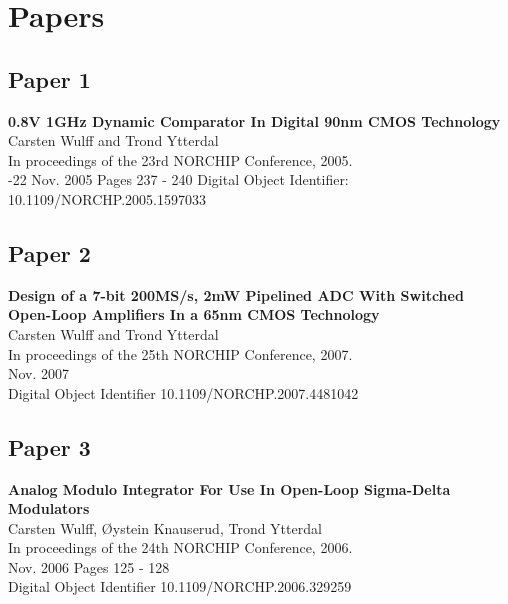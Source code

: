 

\chapter{Papers}\label{sc:papers}
\section{Paper 1}
\textbf{\Large 0.8V 1GHz Dynamic Comparator In Digital 90nm CMOS
  Technology}\\
\indent   Carsten Wulff and Trond Ytterdal\\
\indent In proceedings of the 23rd NORCHIP Conference, 2005. \\
-22 Nov. 2005 Pages 237 - 240 
\indent Digital Object Identifier: 10.1109/NORCHP.2005.1597033\\

\newpage

\section{Paper 2}
\textbf{\Large Design of a 7-bit 200MS/s, 2mW Pipelined ADC With Switched
  Open-Loop Amplifiers In a 65nm CMOS Technology}\\
\indent Carsten Wulff and Trond Ytterdal\\
\indent In proceedings of the 25th NORCHIP Conference, 2007.\\
\indent Nov. 2007\\
\indent  Digital Object Identifier 10.1109/NORCHP.2007.4481042 

\newpage

\section{Paper 3}
\textbf{\Large Analog Modulo Integrator For Use In Open-Loop Sigma-Delta
  Modulators}\\
\indent Carsten Wulff, {\O}ystein Knauserud, Trond Ytterdal\\
\indent In proceedings of the 24th NORCHIP Conference, 2006.\\
\indent Nov. 2006 Pages 125 - 128\\
\indent Digital Object Identifier 10.1109/NORCHP.2006.329259 

